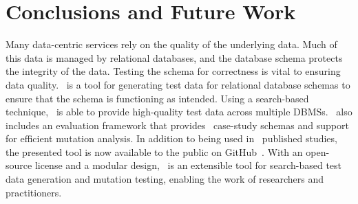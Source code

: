 \section{Conclusions and Future Work}\label{sec:conclusion}

Many data-centric services rely on the quality of the underlying data. Much of this data is managed by relational
databases, and the database schema protects the integrity of the data.  Testing the schema for correctness is vital to
ensuring data quality. \sa~is a tool for generating test data for relational database schemas to ensure that the schema
is functioning as intended. Using a search-based technique, \sa~is able to provide high-quality test data across
multiple DBMSs. \sa~also includes an evaluation framework that provides \numprovidedschemas~case-study schemas and
support for efficient mutation analysis. In addition to being used in \numuniquepapers~published studies, the presented
tool is now available to the public on GitHub~\cite{tool}. With an open-source license and a modular design, \sa~is an
extensible tool for search-based test data generation and mutation testing, enabling the work of researchers and
practitioners.
